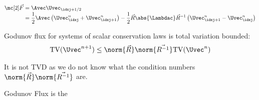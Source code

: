 \begin{defnbox}\nospacing
    \begin{defn}\label{defn:gudonov_flux_systems}
        \begin{align}
          \Fluxvec&=\Avec\Uvec_{\idxj+1/2}\\[-1\jot]
          &=\frac{1}{2}\Avec \left(\Uvec_{\idxj}^{n}+\Uvec_{\idxj+1}^{n}\right)-\frac{1}{2}\vec{R}\abs{\Lambdac}\vec{R}^{-1}\left(\Uvec_{\idxj+1}^{n}-\Uvec_{\idxj}^{n}\right)\nonumber
        \end{align}
    \end{defn}
\end{defnbox}
\begin{propertybox}\nospacing
    \begin{property}\label{property:total_variation_bounded}
        Godunov flux for systems of scalar conservation laws is total variation bounded:
        \begin{align}
          \text{TV}(\Uvec^{n+1})\leq\norm{\vec{R}}\norm{\vec{R^{-1}}}\text{TV}(\Uvec^{n})
        \end{align}
    \end{property}
\end{propertybox}
\begin{notebox}[Note]\nospacing
    It is not TVD as we do not know what the condition numbers $\norm{\vec{R}}\norm{\vec{R^{-1}}}$ are.
\end{notebox}
Godunov Flux is the

